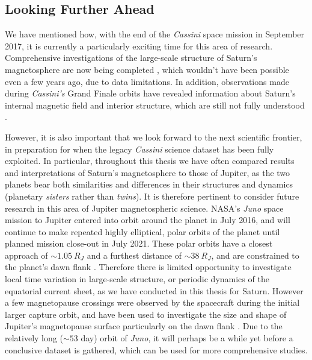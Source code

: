 \subsection{Looking Further Ahead}
We have mentioned how, with the end of the \textit{Cassini} space mission in September 2017, it is currently a particularly exciting time for this area of research. Comprehensive investigations of the large-scale structure of Saturn's magnetosphere are now being completed \citep[e.g.][]{sergis2017,wilson2017}, which wouldn't have been possible even a few years ago, due to data limitations. In addition,  observations made during \textit{Cassini's} Grand Finale orbits have revealed information about Saturn's internal magnetic field and interior structure, which are still not fully understood \citep[e.g.][]{dougherty2018}. 

However, it is also important that we look forward to the next scientific frontier, in preparation for when the legacy \textit{Cassini} science dataset has been fully exploited. In particular, throughout this thesis we have often compared results and interpretations of Saturn's magnetosphere to those of Jupiter, as the two planets bear both similarities and differences in their structures and dynamics (planetary \textit{sisters} rather than \textit{twins}). It is therefore pertinent to consider future research in this area of Jupiter magnetospheric science. NASA's \textit{Juno} space mission to Jupiter \citep{bolton2017} entered into orbit around the planet in July 2016, and will continue to make repeated highly elliptical, polar orbits of the planet until planned mission close-out in July 2021. These polar orbits have a closest approach of $\sim\SI{1.05}{R_J}$ and a furthest distance of $\sim\SI{38}{R_J}$, and are constrained to the planet's dawn flank \citep{bagenal2014}. Therefore there is limited opportunity to investigate local time variation in large-scale structure, or periodic dynamics of the equatorial current sheet, as we have conducted in this thesis for Saturn. However a few magnetopause crossings were observed by the spacecraft during the initial larger capture orbit, and have been used to investigate the size and shape of Jupiter's magnetopause surface particularly on the dawn flank \citep{gershman2017}. Due to the relatively long (${\sim}{53}$ day) orbit of \textit{Juno}, it will perhaps be  a while yet before a conclusive dataset is gathered, which can be used for more comprehensive studies. 

